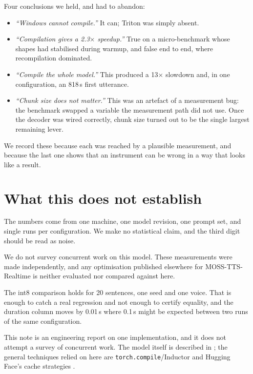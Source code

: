 \documentclass[11pt]{article}
\begin{document}
Four conclusions we held, and had to abandon:

\begin{itemize}
\item \emph{``Windows cannot compile.''} It can; Triton was simply absent.
\item \emph{``Compilation gives a 2.3$\times$ speedup.''} True on a micro-benchmark whose shapes had stabilised
during warmup, and false end to end, where recompilation dominated.
\item \emph{``Compile the whole model.''} This produced a 13$\times$ slowdown and, in one configuration, an
818\,s first utterance.
\item \emph{``Chunk size does not matter.''} This was an artefact of a measurement bug: the benchmark swapped a
variable the measurement path did not use. Once the decoder was wired correctly, chunk size turned out to be the
single largest remaining lever.
\end{itemize}

We record these because each was reached by a plausible measurement, and because the last one shows that an
instrument can be wrong in a way that looks like a result.

\section{What this does not establish}

The numbers come from one machine, one model revision, one prompt set, and single runs per configuration. We make
no statistical claim, and the third digit should be read as noise.

We do not survey concurrent work on this model. These measurements were made independently, and any optimisation
published elsewhere for MOSS-TTS-Realtime is neither evaluated nor compared against here.

The int8 comparison holds for 20 sentences, one seed and one voice. That is enough to catch a real regression and
not enough to certify equality, and the duration column moves by 0.01\,s where 0.1\,s might be expected between
two runs of the same configuration.

This note is an engineering report on one implementation, and it does not attempt a survey of concurrent work.
The model itself is described in \cite{mosstts,mosstokenizer}; the general techniques relied on here are
\texttt{torch.compile}/Inductor \cite{torchcompile} and Hugging Face's cache strategies \cite{staticcache}.
\end{document}
